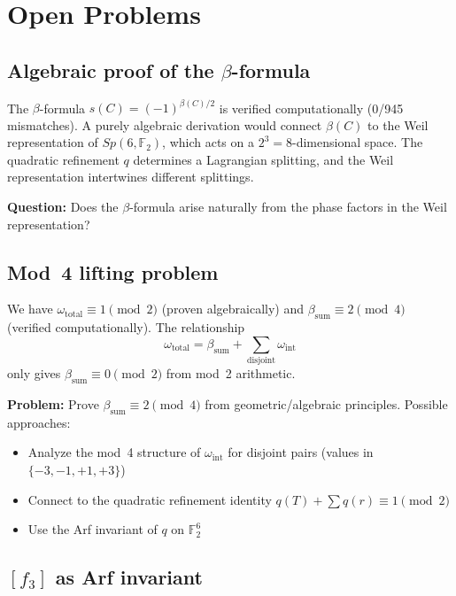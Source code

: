 \documentclass[11pt,a4paper]{article}
\theoremstyle{remark}
\newcommand{\F}{\mathbb{F}}
\begin{document}
\section{Open Problems}
\label{sec:open}

\subsection{\texorpdfstring{Algebraic proof of the $\beta$-formula}{Algebraic proof of the beta-formula}}

The $\beta$-formula $s(C) = (-1)^{\beta(C)/2}$ is verified
computationally (0/945 mismatches). A purely algebraic derivation would
connect $\beta(C)$ to the Weil representation of $Sp(6, \F_2)$, which
acts on a $2^3 = 8$-dimensional space. The quadratic refinement $q$
determines a Lagrangian splitting, and the Weil representation
intertwines different splittings.

\textbf{Question:} Does the $\beta$-formula arise naturally from the
phase factors in the Weil representation?

\subsection{Mod~4 lifting problem}

We have $\omega_{\text{total}} \equiv 1 \pmod{2}$ (proven algebraically)
and $\beta_{\text{sum}} \equiv 2 \pmod{4}$ (verified computationally).
The relationship
\[
\omega_{\text{total}} = \beta_{\text{sum}} + \sum_{\text{disjoint}} \omega_{\text{int}}
\]
only gives $\beta_{\text{sum}} \equiv 0 \pmod{2}$ from mod~2 arithmetic.

\textbf{Problem:} Prove $\beta_{\text{sum}} \equiv 2 \pmod{4}$ from
geometric/algebraic principles. Possible approaches:
\begin{itemize}
\item Analyze the mod~4 structure of $\omega_{\text{int}}$ for disjoint
  pairs (values in $\{-3, -1, +1, +3\}$)
\item Connect to the quadratic refinement identity
  $q(T) + \sum q(r) \equiv 1 \pmod{2}$
\item Use the Arf invariant of $q$ on $\F_2^6$
\end{itemize}

\subsection{\texorpdfstring{$[f_3]$ as Arf invariant}{[f3] as Arf invariant}}
\end{document}

